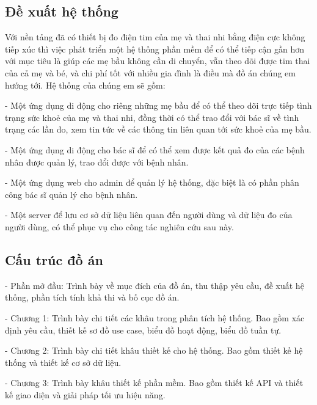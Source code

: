 \documentclass{article}%
\begin{document}

\subsection*{Đề xuất hệ thống}
Với nền tảng đã có thiết bị đo điện tim của mẹ và thai nhi bằng điện cực không tiếp xúc thì việc phát triển một hệ thống
phần mềm để có thể tiếp cận gần hơn với mục tiêu là giúp các mẹ bầu không cần di chuyển, vẫn theo dõi được tim thai của
cả mẹ và bé, và chi phí tốt với nhiều gia đình là điều mà đồ án chúng em hướng tới. Hệ thống của chúng em sẽ gồm:

- Một ứng dụng di động cho riêng những mẹ bầu để có thể theo dõi trực tiếp tình trạng sức khoẻ của mẹ và thai nhi, đồng
thời có thể trao đổi với bác sĩ về tình trạng các lần đo, xem tin tức về các thông tin liên quan tới sức khoẻ của mẹ bầu.

- Một ứng dụng di động cho bác sĩ để có thể xem được kết quả đo của các bệnh nhân được quản lý, trao đổi được với bệnh nhân.

- Một ứng dụng web cho admin để quản lý hệ thống, đặc biệt là có phần phân công bác sĩ quản lý cho bệnh nhân.

- Một server để lưu cơ sở dữ liệu liên quan đến người dùng và dữ liệu đo của người dùng, có thể phục vụ cho công tác nghiên cứu
sau này.

\subsection*{Cấu trúc đồ án}
- Phần mở đầu: Trình bày về mục đích của đồ án, thu thập yêu cầu, đề xuất hệ thống, phần tích tính khả thi và bố cục đồ án.

- Chương 1: Trình bày chi tiết các khâu trong phân tích hệ thống. 
Bao gồm xác định yêu cầu, thiết kế sơ đồ use case, biểu đồ hoạt động, biểu đồ tuần tự.

- Chương 2: Trình bày chi tiết khâu thiết kế cho hệ thống. Bao gồm thiết kế hệ thống và thiết kế cơ sở dữ liệu.

- Chương 3: Trình bày khâu thiết kế phần mềm. Bao gồm thiết kế API và thiết kế giao diện và giải pháp tối ưu hiệu năng.
\end{document}
